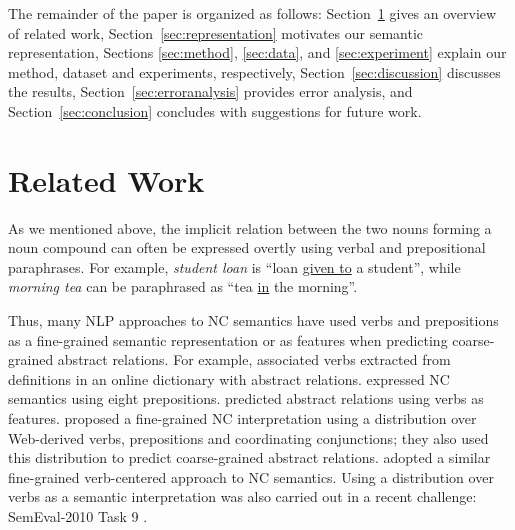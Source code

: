 \documentclass[letterpaper,11pt]{article}
\newcommand{\secref}[2][]{Section#1~\ref{#2}\xspace}
\newcommand{\mymeaning}[1]{``#1''}
\begin{document}
The remainder of the paper is organized as follows:
\secref{sec:relatedwork} gives an overview of related work,
\secref{sec:representation} motivates our semantic representation,
Sections \ref{sec:method}, \ref{sec:data}, and \ref{sec:experiment}
explain our method, dataset and experiments, respectively,
\secref{sec:discussion} discusses the results,
\secref{sec:erroranalysis} provides error analysis,
and \secref{sec:conclusion} concludes with suggestions for future work.



\section{Related Work}
\label{sec:relatedwork}

As we  mentioned above,  the implicit relation  between the  two nouns
forming a  noun compound can  often be expressed overtly  using verbal
and prepositional  paraphrases. For example, \textit{student  loan} is
\mymeaning{loan \underline{given to} a student}, while \textit{morning
tea} can be paraphrased as \mymeaning{tea \underline{in} the morning}.

Thus, many NLP approaches to NC semantics have used verbs and prepositions
as a fine-grained semantic representation
or as features when predicting coarse-grained abstract relations.
For  example,   associated  verbs  extracted
from definitions in an online dictionary with abstract relations.
 expressed NC semantics using eight prepositions.
 predicted abstract relations using verbs as features.
 proposed a fine-grained NC interpretation
using a distribution over Web-derived verbs, prepositions and coordinating conjunctions;
they also used this distribution to predict coarse-grained abstract relations.
 adopted a similar fine-grained verb-centered approach to NC semantics.
Using a distribution over verbs as a semantic interpretation was also carried out in  a recent challenge: SemEval-2010  Task 9
\cite{butnariu-EtAl:2009:SEW,SemEval:2010Paraphrase}.
\end{document}
